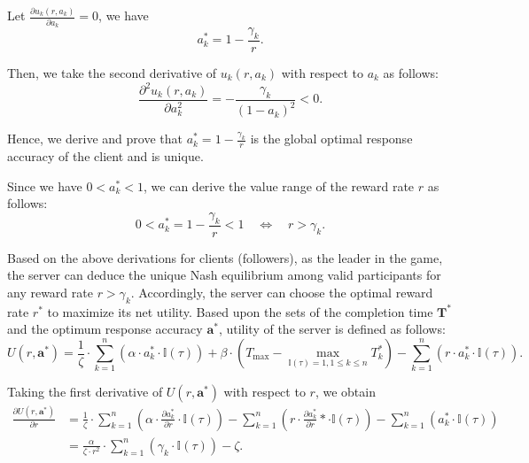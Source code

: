 \documentclass[final,1p,times]{elsarticle}
\begin{document}
Let $\frac{\partial u_k(r,a_k)}{\partial a_k} = 0$, we have
\begin{equation}\label{eq:a_k_ast}
	a_k^\ast = 1 - \frac{\gamma_k}{r}.
\end{equation}	

Then, we take the second derivative of $u_k(r,a_k)$ with respect to $a_k$ as follows:
\begin{equation}
	\frac{\partial^2 u_k(r,a_k)}{\partial a_k^2} = - \frac{\gamma_k}{(1-a_k)^2} < 0.
\end{equation}	

Hence, we derive and prove that $a_k^\ast = 1 - \frac{\gamma_k}{r}$ is the global optimal response accuracy of the client and is unique.

Since we have $0<a_k^\ast<1$, we can derive the value range of the reward rate $r$ as follows:
\begin{equation}
	0 < a_k^\ast = 1 - \frac{\gamma_k}{r} < 1\quad
	\Leftrightarrow\quad r > \gamma_k.
\end{equation}	

Based on the above derivations for clients (followers), as the leader in the game, the server can deduce the unique Nash equilibrium among valid participants for any reward rate $r>\gamma_k$. Accordingly, the server can choose the optimal reward rate $r^\ast$ to maximize its net utility. Based upon the sets of the completion time $\bm{T}^\ast$ and the optimum response accuracy $\bm{a}^\ast$, utility of the server is defined as follows:
\begin{equation}\label{eq:opt_u}
	U(r,\bm{a}^\ast) = \frac{1}{\zeta}\cdot \sum_{k=1}^n(\alpha\cdot a_k^\ast\cdot \mathbb{I}(\tau)) + \beta\cdot(T_{\max}-\max_{\mathbb{I}(\tau)=1,1\le k\le n}T_k^\ast) - \sum_{k=1}^n(r\cdot a_k^\ast\cdot \mathbb{I}(\tau)).
\end{equation}

Taking the first derivative of $U(r,\bm{a}^\ast)$ with respect to $r$, we obtain
\begin{equation}
	\begin{aligned}
		\frac{\partial U(r,\bm{a}^\ast)}{\partial r} &= \frac{1}{\zeta}\cdot \sum_{k=1}^n(\alpha\cdot \frac{\partial a_k^\ast}{\partial r}\cdot \mathbb{I}(\tau)) - \sum_{k=1}^n(r\cdot \frac{\partial a_k^\ast}{\partial r}\ast\cdot \mathbb{I}(\tau)) - \sum_{k=1}^n(a_k^\ast\cdot \mathbb{I}(\tau))\\
		&= \frac{\alpha}{\zeta\cdot r^2}\cdot\sum_{k=1}^n(\gamma_k\cdot\mathbb{I}(\tau))-\zeta.
	\end{aligned}
\end{equation}
\end{document}
